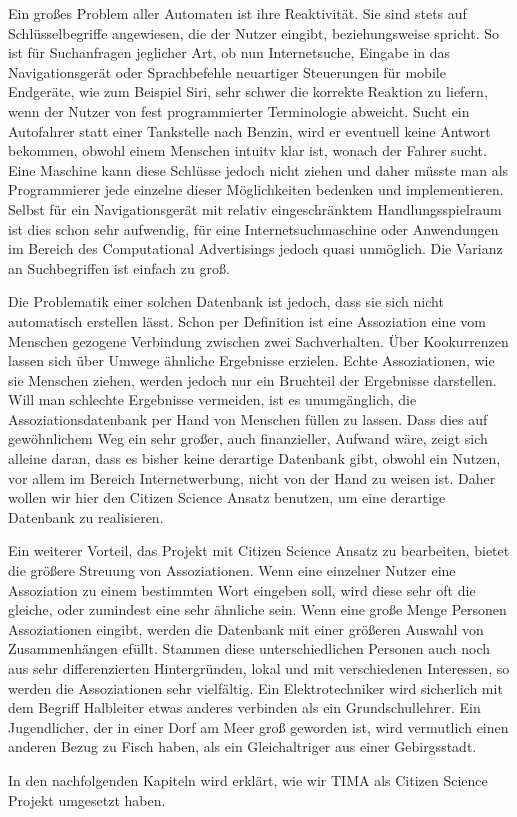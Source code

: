 Ein großes Problem aller Automaten ist ihre Reaktivität. Sie sind stets auf Schlüsselbegriffe angewiesen, die der Nutzer eingibt, beziehungsweise spricht.  So ist für Suchanfragen jeglicher Art, ob nun Internetsuche, Eingabe in das Navigationsgerät oder Sprachbefehle neuartiger Steuerungen für mobile Endgeräte, wie zum Beispiel Siri, sehr schwer die korrekte Reaktion zu liefern, wenn der Nutzer von fest programmierter Terminologie abweicht. Sucht ein Autofahrer statt einer Tankstelle nach Benzin, wird er eventuell keine Antwort bekommen, obwohl einem Menschen intuitv klar ist, wonach der Fahrer sucht. Eine Maschine kann diese Schlüsse jedoch nicht ziehen und daher müsste man als Programmierer jede einzelne dieser Möglichkeiten bedenken und implementieren. Selbst für ein Navigationsgerät mit relativ eingeschränktem Handlungsspielraum ist dies schon sehr aufwendig, für eine Internetsuchmaschine oder Anwendungen im Bereich des Computational Advertisings jedoch quasi unmöglich. Die Varianz an Suchbegriffen ist einfach zu groß. 

Die Problematik einer solchen Datenbank ist jedoch, dass sie sich nicht automatisch erstellen lässt. Schon per Definition ist eine Assoziation eine vom Menschen gezogene Verbindung zwischen zwei Sachverhalten. Über Kookurrenzen lassen sich über Umwege ähnliche Ergebnisse erzielen. %
Echte Assoziationen, wie sie Menschen ziehen, werden jedoch nur ein Bruchteil der Ergebnisse darstellen. Will man schlechte Ergebnisse vermeiden, ist es unumgänglich, die Assoziationsdatenbank per Hand von Menschen füllen zu lassen. Dass dies auf gewöhnlichem Weg ein sehr großer, auch finanzieller, Aufwand wäre, zeigt sich alleine daran, dass es bisher keine derartige Datenbank gibt, obwohl ein Nutzen, vor allem im Bereich Internetwerbung, nicht von der Hand zu weisen ist. Daher wollen wir hier den Citizen Science Ansatz benutzen, um eine derartige Datenbank zu realisieren.

Ein weiterer Vorteil, das Projekt mit Citizen Science Ansatz zu bearbeiten, bietet die größere Streuung von Assoziationen. Wenn eine einzelner Nutzer eine Assoziation zu einem bestimmten Wort eingeben soll, wird diese sehr oft die gleiche, oder zumindest eine sehr ähnliche sein. Wenn eine große Menge Personen Assoziationen eingibt, werden die Datenbank mit einer größeren Auswahl von Zusammenhängen efüllt. Stammen diese unterschiedlichen Personen auch noch aus sehr differenzierten Hintergründen, lokal und mit verschiedenen Interessen, so werden die Assoziationen sehr vielfältig. Ein Elektrotechniker wird sicherlich mit dem Begriff Halbleiter etwas anderes verbinden als ein Grundschullehrer. Ein Jugendlicher, der in einer Dorf am Meer groß geworden ist, wird vermutlich einen anderen Bezug zu Fisch haben, als ein Gleichaltriger aus einer Gebirgsstadt.

In den nachfolgenden Kapiteln wird erklärt, wie wir TIMA als Citizen Science Projekt umgesetzt haben.
